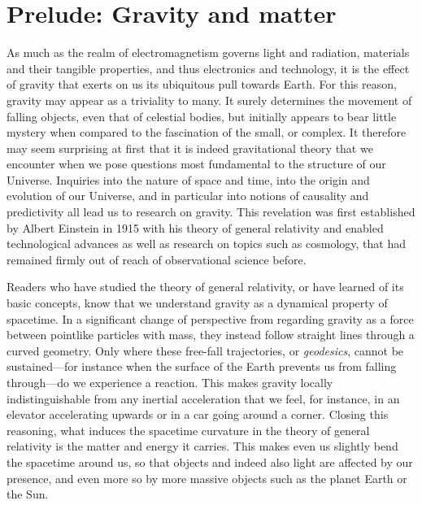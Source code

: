 \chapter{Prelude: Gravity and matter}\label{sec:intro}

As much as the realm of electromagnetism governs light and radiation, materials and their tangible properties, and thus electronics and technology, it is the effect of gravity that exerts on us its ubiquitous pull towards Earth. For this reason, gravity may appear as a triviality to many. It surely determines the movement of falling objects, even that of celestial bodies, but initially appears to bear little mystery when compared to the fascination of the small, or complex. It therefore may seem surprising at first that it is indeed gravitational theory that we encounter when we pose questions most fundamental to the structure of our Universe. Inquiries into the nature of space and time, into the origin and evolution of our Universe, and in particular into notions of causality and predictivity all lead us to research on gravity. This revelation was first established by Albert Einstein in 1915 with his theory of general relativity and enabled technological advances as well as research on topics such as cosmology, that had remained firmly out of reach of observational science before.


Readers who have studied the theory of general relativity, or have learned of its basic concepts, know that we understand gravity as a dynamical property of spacetime. In a significant change of perspective from regarding gravity as a force between pointlike particles with mass, they instead follow straight lines through a curved geometry. Only where these free-fall trajectories, or \emph{geodesics}, cannot be sustained---for instance when the surface of the Earth prevents us from falling through---do we experience a reaction. This makes gravity locally indistinguishable from any inertial acceleration that we feel, for instance, in an elevator accelerating upwards or in a car going around a corner. Closing this reasoning, what induces the spacetime curvature in the theory of general relativity is the matter and energy it carries. This makes even us slightly bend the spacetime around us, so that objects and indeed also light are affected by our presence, and even more so by more massive objects such as the planet Earth or the Sun.

